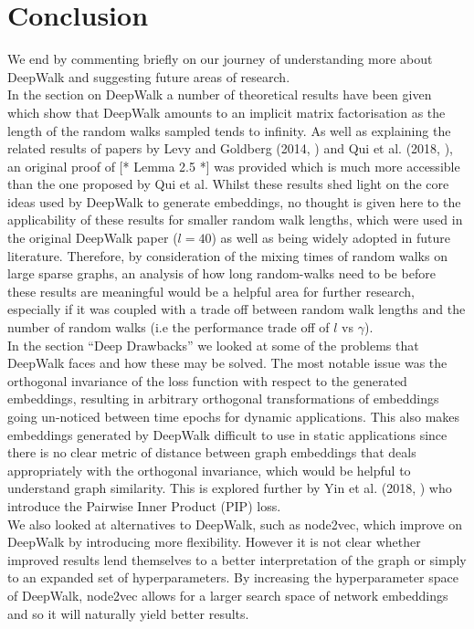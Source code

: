 \documentclass[a4paper]{article}
\begin{document}
\section{Conclusion}
We end by commenting briefly on our journey of understanding more about DeepWalk and suggesting future areas of research.\\
In the section on DeepWalk a number of theoretical results have been given which show that DeepWalk amounts to an implicit matrix factorisation as the length of the random walks sampled tends to infinity.
As well as explaining the related results of papers by Levy and Goldberg (2014, \cite{levy&goldberg}) and  Qui et al. (2018, \cite{qiu2018}), an original proof of [* Lemma 2.5 *] was provided which is much more accessible than the one proposed by Qui et al.
Whilst these results shed light on the core ideas used by DeepWalk to generate embeddings, no thought is given here to the applicability of these results for smaller random walk lengths, which were used in the original DeepWalk paper ($l = 40$) as well as being widely adopted in future literature. Therefore, by consideration of the mixing times of random walks on large sparse graphs, an analysis of how long random-walks need to be before these
results are meaningful would be a helpful area for further research, especially if it was coupled with a trade off between random walk lengths and the number of random walks (i.e the performance trade off of $l$ vs $\gamma$).\\
In the section ``Deep Drawbacks'' we looked at some of the problems that DeepWalk faces and how these may be solved. The most notable issue was the orthogonal invariance of the loss function with respect to the generated embeddings, resulting in arbitrary orthogonal transformations of embeddings going un-noticed
between time epochs for dynamic applications. This also makes embeddings generated by DeepWalk difficult to use in static applications since there is no clear metric of distance between graph embeddings that deals appropriately with the orthogonal invariance, which would be helpful to understand graph similarity. This is explored further by Yin et al. (2018, \cite{yin2018}) who introduce the Pairwise Inner Product (PIP) loss.\\
We also looked at alternatives to DeepWalk, such as node2vec, which improve on DeepWalk by introducing more flexibility. However it is not clear whether improved results lend themselves to a better interpretation of the graph or simply to an expanded set of hyperparameters. By increasing the hyperparameter space of DeepWalk, node2vec allows for a larger search space of network embeddings and so it will naturally yield better results.
\end{document}
